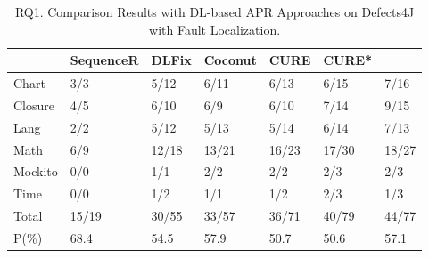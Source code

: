\begin{table}[t]
  \caption{RQ1. Comparison Results with DL-based APR Approaches on Defects4J \underline {with Fault Localization}.}
  \vspace{-6pt}
  {\small
			\begin{center}
				\renewcommand{\arraystretch}{1}
				\begin{tabular}{p{0.8cm}<{\centering}|p{1.2cm}<{\centering}|p{0.9cm}<{\centering}|p{1cm}<{\centering}|p{0.8cm}<{\centering}|p{0.8cm}<{\centering}|p{0.8cm}<{\centering}}
					
					\hline
					&\textbf{SequenceR}&\textbf{DLFix}& \textbf{Coconut}&\textbf{CURE}&\textbf{CURE*}&\textbf{\tool}\\
					\hline
					Chart  & 3/3   & 5/12  & 6/11  & 6/13  & 6/15 & 7/16\\
					Closure& 4/5   & 6/10  & 6/9   & 6/10  & 7/14 & 9/15\\
					Lang   & 2/2   & 5/12  & 5/13  & 5/14  & 6/14  & 7/13\\
					Math    & 6/9  & 12/18 & 13/21 & 16/23 & 17/30 & 18/27\\
					Mockito & 0/0   & 1/1   & 2/2   & 2/2  & 2/3  & 2/3\\
					Time    & 0/0   & 1/2   & 1/1   & 1/2  & 2/3  & 1/3\\
					\hline
					Total   & 15/19 & 30/55 & 33/57 & 36/71 & 40/79 & 44/77\\
					\hline
					P(\%)  & 68.4  & 54.5  & 57.9  & 50.7  & 50.6  & 57.1\\
					\hline
				\end{tabular}
				\label{RQ1_defects4J_with_FL}
			\end{center}
                }
		\end{table}

















